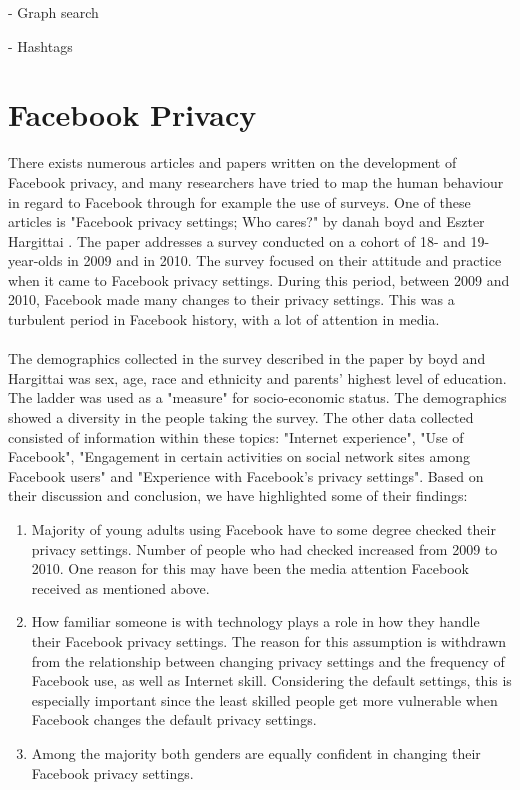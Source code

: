 - Graph search

- Hashtags

\section{Facebook Privacy}
There exists numerous articles and papers written on the development of Facebook privacy, and many researchers have tried to map the human behaviour in regard to Facebook through for example the use of surveys. One of these articles is "Facebook privacy settings; Who cares?" by danah boyd and Eszter Hargittai \cite{whocares}. The paper addresses a survey conducted on a cohort of 18- and 19-year-olds in 2009 and in 2010. The survey focused on their attitude and practice when it came to Facebook privacy settings. During this period, between 2009 and 2010, Facebook made many changes to their privacy settings. This was a turbulent period in Facebook history, with a lot of attention in media.

\paragraph{}
The demographics collected in the survey described in the paper by boyd and Hargittai was sex, age, race and ethnicity and parents' highest level of education. The ladder was used as a "measure" for socio-economic status. The demographics showed a diversity in the people taking the survey. The other data collected consisted of information within these topics: "Internet experience", "Use of Facebook", "Engagement in certain activities on social network sites among Facebook users" and "Experience with Facebook's privacy settings". Based on their discussion and conclusion, we have highlighted some of their findings: 

\begin{enumerate}
\item Majority of young adults using Facebook have to some degree checked their privacy settings. Number of people who had checked increased from 2009 to 2010. One reason for this may have been the media attention Facebook received as mentioned above. 
\item How familiar someone is with technology plays a role in how they handle their Facebook privacy settings. The reason for this assumption is withdrawn from the relationship between changing privacy settings and the frequency of Facebook use, as well as Internet skill. Considering the default settings, this is especially important since the least skilled people get more vulnerable when Facebook changes the default privacy settings. 
\item Among the majority both genders are equally confident in changing their Facebook privacy settings. 
\end{enumerate}


